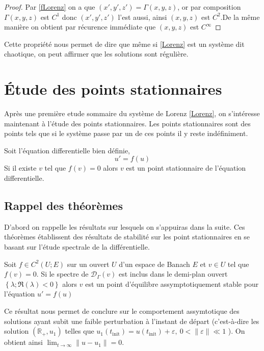 \documentclass{article}
\newcommand{\R}{\mathbb{R}}
\newcommand{\cad}{c'est-\`a-dire }
\newtheorem[M , nocut]{prop}{Proposition}[section]
\newtheorem[M]{propt}{Propriété}[section]
\newtheorem[L , nocut]{thm}{Théoreme}
\newtheorem[L]{cor}{Corollaire}
\begin{document}
\begin{proof}
    Par \eqref{fLorenz} on a que $(x',y',z') = \Gamma(x,y,z)$, or par composition $\Gamma(x,y,z)$ est $C^1$ donc $(x',y',z')$ l'est aussi, ainsi $(x,y,z)$ est $C^2$.De la même manière on obtient par récurence immédiate que $(x,y,z)$ est $C^\infty$
\end{proof}

Cette propriété nous permet de dire que même si \eqref{Lorenz} est un système dit chaotique, on peut affirmer que les solutions sont régulière.

\section{\'Etude des points stationnaires}
Après une première etude sommaire du système de Lorenz \eqref{Lorenz}, on s'intéresse maintenant à l'étude des points stationnaires. Les points stationnaires sont des points tels que si le système passe par un de ces points il y reste indéfiniment.

\begin{thm}
    Soit l'équation differentielle bien définie,
    \begin{equation*}
        u'=f(u)
    \end{equation*}
    Si il existe $v$ tel que $f(v)=0$ alors $v$ est un point stationnaire de l'équation differentielle.
\end{thm}

\subsection{Rappel des théorèmes}
\label{sec:Rappel-des-théorèmes}
D'abord on rappelle les résultats sur lesquels on s'appuiras dans la suite. Ces théorèmes établissent des résultats de stabilité sur les point stationnaires en se basant sur l'étude spectrale de la différentielle.
\begin{thm}
    \label{thm:eq-ass-stable}
    Soit $f\in C^2(U;E)$ sur un ouvert $U$ d'un espace de Banach $E$ et $v\in U$ tel que $f(v)=0$. Si le spectre de $\mathcal{D}_\Gamma(v)$ est inclus dans le demi-plan ouvert $\left\{\lambda; \Re(\lambda)<0\right\}$ alors $v$ est un point d'équilibre assymptotiquement stable pour l'équation $u'=f(u)$
\end{thm}

Ce résultat nous permet de conclure sur le comportement assymtotique des solutions ayant subit une faible perturbation à l'instant de départ (\cad les solution $(\R_+,u_1)$ telles que $u_1(t_{\text{init}})=u(t_{\text{init}})+\varepsilon,\ 0<\|\varepsilon\|\ll 1 $ ). On obtient ainsi $\lim_{t\to\infty}\|u-u_1\| = 0$.
\end{document}
